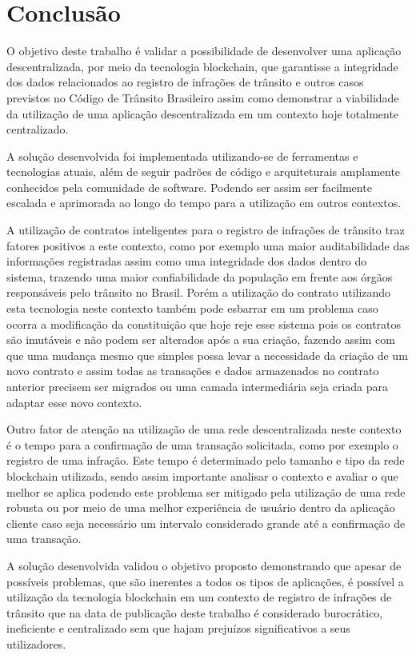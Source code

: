 \chapter[Conclusão]{Conclusão}


O objetivo deste trabalho é validar a possibilidade de desenvolver uma aplicação descentralizada, por meio da tecnologia blockchain, que garantisse a integridade dos dados relacionados ao registro de infrações de trânsito e outros casos previstos no Código de Trânsito Brasileiro assim como demonstrar a viabilidade da utilização de uma aplicação descentralizada em um contexto hoje totalmente centralizado.

A solução desenvolvida foi implementada utilizando-se de ferramentas e tecnologias atuais, além de seguir padrões de código e arquiteturais amplamente conhecidos pela comunidade de software. Podendo ser assim ser facilmente escalada e aprimorada ao longo do tempo para a utilização em outros contextos.

A utilização de contratos inteligentes para o registro de infrações de trânsito traz fatores positivos a este contexto, como por exemplo uma maior auditabilidade das informações registradas assim como uma integridade dos dados dentro do sistema, trazendo uma maior confiabilidade da população em frente aos órgãos responsáveis pelo trânsito no Brasil. Porém a utilização do contrato utilizando esta tecnologia neste contexto também pode esbarrar em um problema caso ocorra a modificação da constituição que hoje reje esse sistema pois os contratos são imutáveis e não podem ser alterados após a sua criação, fazendo assim com que uma mudança mesmo que simples possa levar a necessidade da criação de um novo contrato e assim todas as transações e dados armazenados no contrato anterior precisem ser migrados ou uma camada intermediária seja criada para adaptar esse novo contexto.

Outro fator de atenção na utilização de uma rede descentralizada neste contexto é o tempo para a confirmação de uma transação solicitada, como por exemplo o registro de uma infração. Este tempo é determinado pelo tamanho e tipo da rede blockchain utilizada, sendo assim importante analisar o contexto e avaliar o que melhor se aplica podendo este problema ser mitigado pela utilização de uma rede robusta ou por meio de uma melhor experiência de usuário dentro da aplicação cliente caso seja necessário um intervalo considerado grande até a confirmação de uma transação.

A solução desenvolvida validou o objetivo proposto demonstrando que apesar de possíveis problemas, que são inerentes a todos os tipos de aplicações, é possível a utilização da tecnologia blockchain em um contexto de registro de infrações de trânsito que na data de publicação deste trabalho é considerado burocrático, ineficiente e centralizado sem que hajam prejuízos significativos a seus utilizadores. 

